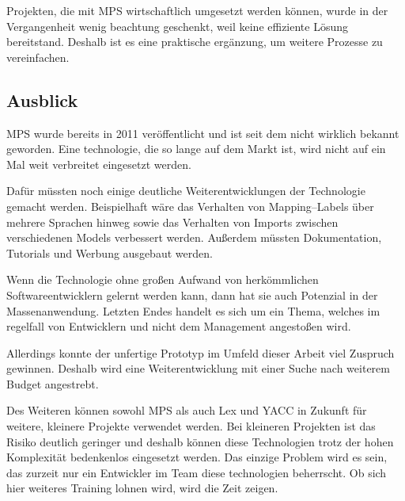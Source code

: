 Projekten, die mit \ac{MPS} wirtschaftlich umgesetzt werden können, wurde in der Vergangenheit wenig beachtung geschenkt, weil keine effiziente Lösung bereitstand.
Deshalb ist es eine praktische ergänzung, um weitere Prozesse zu vereinfachen.

\subsection{Ausblick}\label{subsec:ausblick}
\ac{MPS} wurde bereits in 2011 veröffentlicht und ist seit dem nicht wirklich bekannt geworden.
Eine technologie, die so lange auf dem Markt ist, wird nicht auf ein Mal weit verbreitet eingesetzt werden.

Dafür müssten noch einige deutliche Weiterentwicklungen der Technologie gemacht werden.
Beispielhaft wäre das Verhalten von Mapping--Labels über mehrere Sprachen hinweg sowie das Verhalten von Imports zwischen verschiedenen Models verbessert werden.
Außerdem müssten Dokumentation, Tutorials und Werbung ausgebaut werden.

Wenn die Technologie ohne großen Aufwand von herkömmlichen Softwareentwicklern gelernt werden kann, dann hat sie auch Potenzial in der Massenanwendung.
Letzten Endes handelt es sich um ein Thema, welches im regelfall von Entwicklern und nicht dem Management angestoßen wird.

Allerdings konnte der unfertige Prototyp im Umfeld dieser Arbeit viel Zuspruch gewinnen.
Deshalb wird eine Weiterentwicklung mit einer Suche nach weiterem Budget angestrebt.

Des Weiteren können sowohl \ac{MPS} als auch Lex und \ac{YACC} in Zukunft für weitere, kleinere Projekte verwendet werden.
Bei kleineren Projekten ist das Risiko deutlich geringer und deshalb können diese Technologien trotz der hohen Komplexität bedenkenlos eingesetzt werden.
Das einzige Problem wird es sein, das zurzeit nur ein Entwickler im Team diese technologien beherrscht.
Ob sich hier weiteres Training lohnen wird, wird die Zeit zeigen.